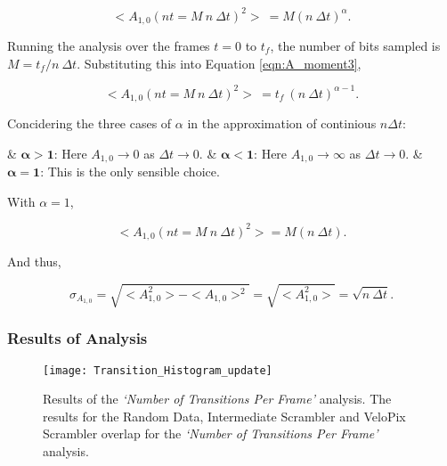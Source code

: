 \begin{description}
					\begin{equation}
						<A_{1,0}(nt = M\ n\ \Delta t)^2>\ = M (n\ \Delta t)^\alpha.
						\label{eqn:A_moment3}
					\end{equation}

					Running the analysis over the frames $t = 0$ to $t_f$, the number of bits sampled is $M = {t_f / n\ \Delta t}$. Substituting this into Equation \ref{eqn:A_moment3},

					\begin{equation}
						<A_{1,0}(nt = M\ n\ \Delta t)^2>\ = t_f\ (n\ \Delta t)^{\alpha -1}.
					\end{equation}

					Concidering the three cases of $\alpha$ in the approximation of continious $n \Delta t$:
					
					\vspace{1em}

					\begin{easylist}[itemize]
						& $\bm{\alpha > 1}$: Here $A_{1,0} \to 0$ as $\Delta t \to 0$.
						& $\bm{\alpha < 1}$: Here $A_{1,0} \to \infty$ as $\Delta t \to 0$.
						& $\bm{\alpha = 1}$: This is the only sensible choice.
					\end{easylist}
					
					\vspace{1em}

					With $\alpha =1$,

					\begin{equation}
						<A_{1,0}(nt = M\ n\ \Delta t)^2> = M (n\ \Delta t).
					\end{equation}

					And thus,

					\begin{equation}
						\sigma_{A_{1,0}} = \sqrt{<A_{1,0}^2> - <A_{1,0}>^2} = \sqrt{<A_{1,0}^2>} = \sqrt{n\ \Delta t}.
					\end{equation}

			\end{description}	

		\subsubsection{Results of Analysis}
		\label{subsub:algorithm_results}
			\begin{SCfigure}%
				\centering
				\texttt{[image: Transition\_Histogram\_update]}
				\caption{Results of the \textit{`Number of Transitions Per Frame'} analysis. The results for the Random Data, Intermediate Scrambler and VeloPix Scrambler overlap for the \textit{`Number of Transitions Per Frame'} analysis.}
				\label{fig:transitions_per_frame}
			\end{SCfigure}

